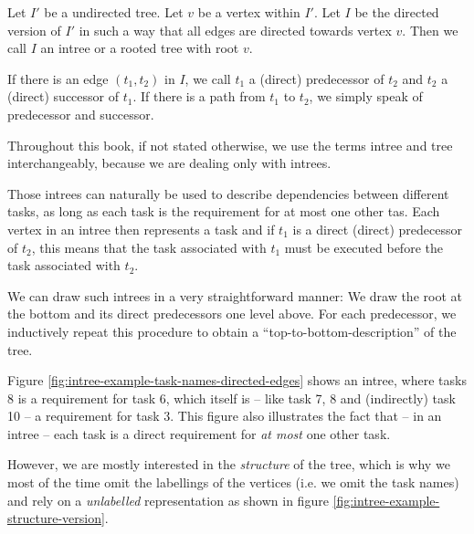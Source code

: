 \begin{definition}[Intree]
  Let $I'$ be a undirected tree. Let $v$ be a vertex within $I'$. Let $I$ be the directed version of $I'$ in such a way that all edges are directed towards vertex $v$. Then we call $I$ an intree or a rooted tree with root $v$.

  If there is an edge $(t_1, t_2)$ in $I$, we call $t_1$ a (direct) predecessor of $t_2$ and $t_2$ a (direct) successor of $t_1$. If there is a path from $t_1$ to $t_2$, we simply speak of predecessor and successor.
\end{definition}

Throughout this book, if not stated otherwise, we use the terms intree and tree interchangeably, because we are dealing only with intrees.

Those intrees can naturally be used to describe dependencies between different tasks, as long as each task is the requirement for at most one other tas. Each vertex in an intree then represents a task and if $t_1$ is a direct (direct) predecessor of $t_2$, this means that the task associated with $t_1$ must be executed before the task associated with $t_2$.

We can draw such intrees in a very straightforward manner: We draw the root at the bottom and its direct predecessors one level above. For each predecessor, we inductively repeat this procedure to obtain a ``top-to-bottom-description'' of the tree.

Figure \ref{fig:intree-example-task-names-directed-edges} shows an intree, where tasks 8 is a requirement for task 6, which itself is -- like task 7, 8 and (indirectly) task 10 -- a requirement for task 3. This figure also illustrates the fact that -- in an intree -- each task is a direct requirement for \emph{at most} one other task.

However, we are mostly interested in the \emph{structure} of the tree, which is why we most of the time omit the labellings of the vertices (i.e. we omit the task names) and rely on a \emph{unlabelled} representation as shown in figure \ref{fig:intree-example-structure-version}.


